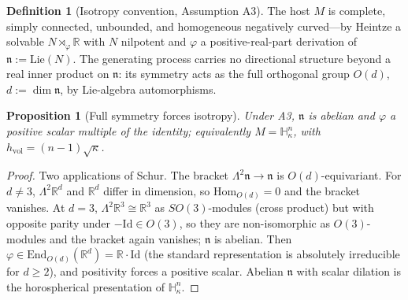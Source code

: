 \documentclass[11pt,reqno]{amsart}
\theoremstyle{plain}
\newtheorem{proposition}[theorem]{Proposition}
\theoremstyle{definition}
\newtheorem{definition}[theorem]{Definition}
\newcommand{\hvol}{h_{\mathrm{vol}}}
\newcommand{\Hk}{\mathbb{H}^n_\kappa}
\begin{document}
\begin{definition}[Isotropy convention, Assumption A3]
The host $M$ is complete, simply connected, unbounded, and homogeneous negatively curved---by Heintze \cite{heintze1974} a solvable $N\rtimes_\varphi\mathbb R$ with $N$ nilpotent and $\varphi$ a positive-real-part derivation of $\mathfrak n:=\mathrm{Lie}(N)$. The generating process carries no directional structure beyond a real inner product on $\mathfrak n$: its symmetry acts as the full orthogonal group $O(d)$, $d:=\dim\mathfrak n$, by Lie-algebra automorphisms.
\end{definition}

\begin{proposition}[Full symmetry forces isotropy]\label{prop:schur}
Under A3, $\mathfrak n$ is abelian and $\varphi$ a positive scalar multiple of the identity; equivalently $M=\Hk$, with $\hvol=(n-1)\sqrt\kappa$.
\end{proposition}

\begin{proof}
Two applications of Schur. The bracket $\Lambda^2\mathfrak n\to\mathfrak n$ is $O(d)$-equivariant. For $d\ne3$, $\Lambda^2\mathbb R^d$ and $\mathbb R^d$ differ in dimension, so $\mathrm{Hom}_{O(d)}=0$ and the bracket vanishes. At $d=3$, $\Lambda^2\mathbb R^3\cong\mathbb R^3$ as $SO(3)$-modules (cross product) but with opposite parity under $-\mathrm{Id}\in O(3)$, so they are non-isomorphic as $O(3)$-modules and the bracket again vanishes; $\mathfrak n$ is abelian. Then $\varphi\in\mathrm{End}_{O(d)}(\mathbb R^d)=\mathbb R\cdot\mathrm{Id}$ (the standard representation is absolutely irreducible for $d\ge2$), and positivity forces a positive scalar. Abelian $\mathfrak n$ with scalar dilation is the horospherical presentation of $\Hk$.
\end{proof}
\end{document}
